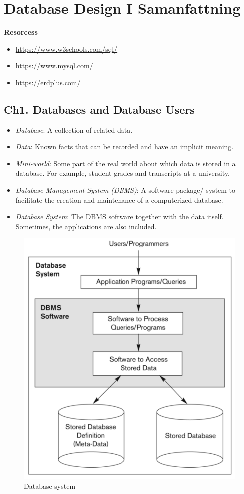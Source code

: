 \chapter{Database Design I Samanfattning}

\textbf{Resorcess}
\begin{itemize}
    \item \url{https://www.w3schools.com/sql/}
    \item \url{https://www.mysql.com/}
    \item \url{https://erdplus.com/}
\end{itemize}


\newpage
\section{Ch1. Databases and Database Users}
\begin{itemize}
    \item \textit{Database}: A collection of related data.
    \item \textit{Data}: Known facts that can be recorded and have an implicit meaning.
    \item \textit{Mini-world}: Some part of the real world about which data is stored 
    in a database. For example, student grades and transcripts at a university.
    \item \textit{Database Management System (DBMS)}: A software package/ system to 
    facilitate the creation and maintenance of a computerized database.
    \item \textit{Database System}: The DBMS software together with the data itself. 
    Sometimes, the applications are also included.
\end{itemize}

\begin{figure}[!h]
    \centering
    \includegraphics[width=12cm]{image/database-system.pdf}
    \caption{Database system}
\end{figure}

